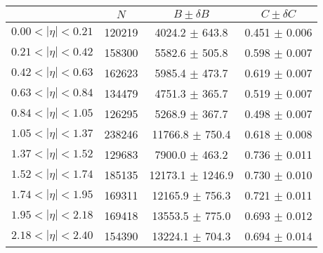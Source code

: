 \begin{tabular}{lccc}
\hline
    &   $N$   & $B \pm \delta B$  &  $C \pm \delta C$ \\
\hline
$0.00 < |\eta| <0.21$          & 120219     & 4024.2     $\pm$ 643.8 & 0.451      $\pm$ 0.006 \\
$0.21 < |\eta| <0.42$          & 158300     & 5582.6     $\pm$ 505.8 & 0.598      $\pm$ 0.007 \\
$0.42 < |\eta| <0.63$          & 162623     & 5985.4     $\pm$ 473.7 & 0.619      $\pm$ 0.007 \\
$0.63 < |\eta| <0.84$          & 134479     & 4751.3     $\pm$ 365.7 & 0.519      $\pm$ 0.007 \\
$0.84 < |\eta| <1.05$          & 126295     & 5268.9     $\pm$ 367.7 & 0.498      $\pm$ 0.007 \\
$1.05 < |\eta| <1.37$          & 238246     & 11766.8    $\pm$ 750.4 & 0.618      $\pm$ 0.008 \\
$1.37 < |\eta| <1.52$          & 129683     & 7900.0     $\pm$ 463.2 & 0.736      $\pm$ 0.011 \\
$1.52 < |\eta| <1.74$          & 185135     & 12173.1    $\pm$ 1246.9 & 0.730      $\pm$ 0.010 \\
$1.74 < |\eta| <1.95$          & 169311     & 12165.9    $\pm$ 756.3 & 0.721      $\pm$ 0.011 \\
$1.95 < |\eta| <2.18$          & 169418     & 13553.5    $\pm$ 775.0 & 0.693      $\pm$ 0.012 \\
$2.18 < |\eta| <2.40$          & 154390     & 13224.1    $\pm$ 704.3 & 0.694      $\pm$ 0.014 \\
\hline
\end{tabular}

